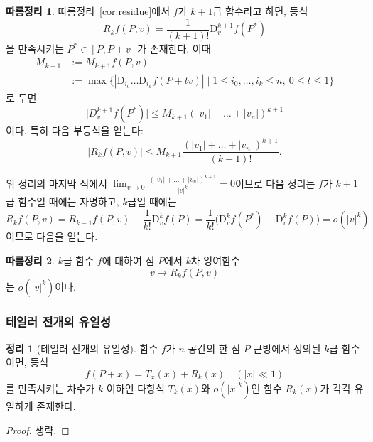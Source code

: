 \documentclass[unfonts,oneside,a4paper]{oblivoir}
\theoremstyle{definition}
\theoremstyle{theorem}
\newtheorem{theorem}{정리}[subsubsection]
\newtheorem{corollary}{따름정리}[subsubsection]
\renewcommand{\vec}[1]{\bm{\mathit{#1}}}
\newcommand{\vecz}{\bm{\mathrm{0}}}
\newcommand{\dD}{\mathrm{D}}
\begin{document}
\begin{corollary}
    따름정리~\ref{cor:residue}에서 $f$가 $k + 1$급 함수라고 하면, 등식
    \begin{equation*}
        R_k f(P, \vec v) = \frac{1}{(k + 1)!} \dD_{\vec v}^{k + 1} f(P^*)
    \end{equation*}
    을 만족시키는 $P^* \in [P, P + \vec v]$가 존재한다.
    이때
    \begin{align*}
        M_{k + 1} &:= M_{k + 1} f(P, \vec v)\\
                  &:= \max \{|\dD_{i_0} \dots \dD_{i_k} f(P + t \vec v)| \mid 1 \leq i_0, \dots, i_k \leq n,\ 0 \leq t \leq 1\}
    \end{align*}
    로 두면
    \begin{equation*}
        \bigl|D_{\vec v}^{k + 1} f(P^*)\bigr| \leq M_{k + 1} (|v_1| + \dots + |v_n|)^{k + 1}
    \end{equation*}
    이다.
    특히 다음 부등식을 얻는다:
    \begin{equation*}
        |R_k f(P, \vec v)| \leq M_{k + 1} \frac{(|v_1| + \dots + |v_n|)^{k + 1}}{(k + 1)!}.
    \end{equation*}
\end{corollary}

위 정리의 마지막 식에서 $\lim_{\vec v \rightarrow \vecz} \frac{(|v_1| + \dots + |v_n|)^{k + 1}}{|\vec v|^k} = 0$이므로 다음 정리는 $f$가 $k + 1$급 함수일 때에는 자명하고, $k$급일 때에는
\begin{equation*}
    R_k f(P, \vec v) = R_{k - 1} f(P, \vec v) - \frac{1}{k!} \dD_{\vec v}^k f(P) = \frac{1}{k!} \bigl(\dD_{\vec v}^k f(P^*) - \dD_{\vec v}^k f(P)\bigr) = o(|\vec v|^k)
\end{equation*}
이므로 다음을 얻는다.

\begin{corollary}
    $k$급 함수 $f$에 대하여 점 $P$에서 $k$차 잉여함수
    \begin{equation*}
        \vec v \mapsto R_k f(P, \vec v)
    \end{equation*}
    는 $o(|\vec v|^k)$이다.
\end{corollary}

\subsubsection{테일러 전개의 유일성}

\begin{theorem}[테일러 전개의 유일성]
    함수 $f$가 $n$-공간의 한 점 $P$ 근방에서 정의된 $k$급 함수이면, 등식
    \begin{equation*}
        f(P + \vec x) = T_x (\vec x) + R_k (\vec x) \quad (|\vec x| \ll 1)
    \end{equation*}
    를 만족시키는 차수가 $k$ 이하인 다항식 $T_k(\vec x)$와 $o(|\vec x|^k)$인 함수 $R_k(\vec x)$가 각각 유일하게 존재한다.
\end{theorem}
\begin{proof}
    생략.
\end{proof}
\end{document}
